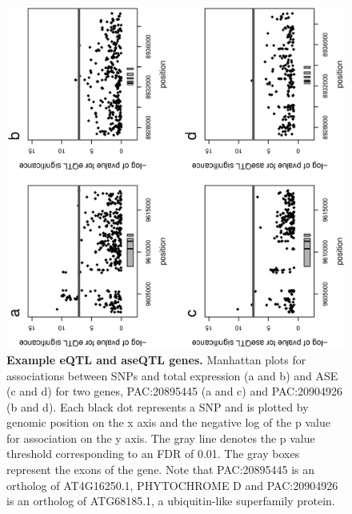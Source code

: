 \begin{figure}[h!]
      \centering
       \includegraphics[width=\linewidth]{Ch3FigS3}
    \caption{\textbf{Example eQTL and aseQTL genes.} Manhattan plots for associations between SNPs and total expression (a and b) and ASE (c and d) for two genes, PAC:20895445 (a and c) and PAC:20904926 (b and d). Each black dot represents a SNP and is plotted by genomic position on the x axis and the negative log of the p value for association on the y axis. The gray line denotes the p value threshold corresponding to an FDR of 0.01. The gray boxes represent the exons of the gene. Note that PAC:20895445 is an ortholog of AT4G16250.1, PHYTOCHROME D and PAC:20904926 is an ortholog of ATG68185.1, a ubiquitin-like superfamily protein.}
    \label{fig:3figS3}
\end{figure}

